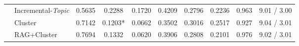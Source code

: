\begin{table*}[t]
\begin{tabular}{@{}clcccccccc@{}}
 & \multicolumn{1}{l|}{Incremental-\textit{Topic}} & 0.5635 & 0.2288 & \multicolumn{1}{c|}{0.1720} & 0.4209 & 0.2796 & \multicolumn{1}{c|}{0.2236} & 0.963 & 9.01 / 3.00 \\
 & \multicolumn{1}{l|}{Cluster} & 0.7142 & 0.1203* & \multicolumn{1}{c|}{0.0662} & 0.3502 & 0.3016 & \multicolumn{1}{c|}{0.2517} & 0.927 & 9.04 / 3.01 \\
 & \multicolumn{1}{l|}{RAG+Cluster} & 0.7694 & 0.1332 & \multicolumn{1}{c|}{0.0620} & 0.3906 & 0.2808 & \multicolumn{1}{c|}{0.2101} & 0.976 & 9.02 / 3.01 \\ \midrule
 
 

\end{tabular}
\end{table*}
